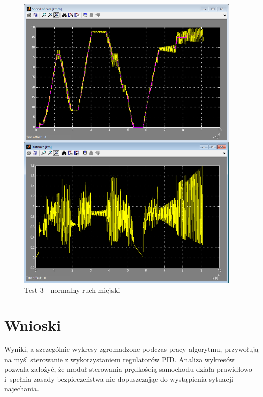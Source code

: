 \documentclass[11pt,a4paper]{article}
\begin{document}
\begin{figure}
\centering
\includegraphics[width=0.95\textwidth]{city.png}
\caption{Test 3 - normalny ruch miejski} 
\label{img:test3}
\end{figure}

\section{Wnioski}
Wyniki, a szczególnie wykresy zgromadzone podczas pracy algorytmu, przywołują na myśl sterowanie z wykorzystaniem regulatorów PID. Analiza wykresów pozwala założyć, że moduł sterowania prędkością samochodu działa prawidłowo i~spełnia zasady bezpieczeństwa nie dopuszczając do wystąpienia sytuacji najechania.
\end{document}
